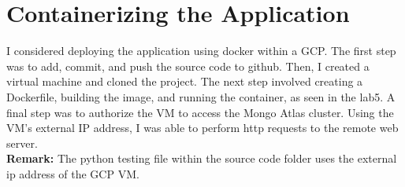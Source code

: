 \documentclass[12pt]{article}
\begin{document}
\section{Containerizing the Application }
I considered deploying the application using docker within a GCP. The first step was to add, commit, and push the source code to github. Then, I created a virtual machine and cloned the project. The next step involved creating a Dockerfile, building the image, and running the container, as seen in the lab5. A final step was to authorize the VM to access the Mongo Atlas cluster. Using the VM's external IP address, I was able to perform http requests to the remote web server.\\
\textbf{Remark:} The python testing file within the source code folder uses the external ip address of the GCP VM. 
\end{document}
